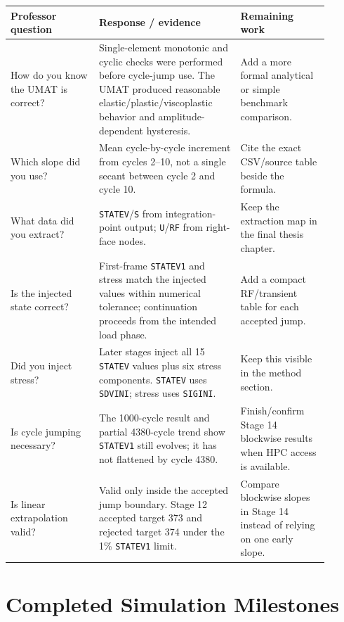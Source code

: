 \documentclass[11pt,a4paper]{article}
\begin{document}
\begin{longtable}{p{0.25\linewidth}p{0.40\linewidth}p{0.25\linewidth}}
\toprule
Professor question & Response / evidence & Remaining work \\
\midrule
\endhead
How do you know the UMAT is correct? & Single-element monotonic and cyclic checks were performed before cycle-jump use. The UMAT produced reasonable elastic/plastic/viscoplastic behavior and amplitude-dependent hysteresis. & Add a more formal analytical or simple benchmark comparison. \\
Which slope did you use? & Mean cycle-by-cycle increment from cycles 2--10, not a single secant between cycle 2 and cycle 10. & Cite the exact CSV/source table beside the formula. \\
What data did you extract? & \texttt{STATEV}/\texttt{S} from integration-point output; \texttt{U}/\texttt{RF} from right-face nodes. & Keep the extraction map in the final thesis chapter. \\
Is the injected state correct? & First-frame \texttt{STATEV1} and stress match the injected values within numerical tolerance; continuation proceeds from the intended load phase. & Add a compact RF/transient table for each accepted jump. \\
Did you inject stress? & Later stages inject all 15 \texttt{STATEV} values plus six stress components. \texttt{STATEV} uses \texttt{SDVINI}; stress uses \texttt{SIGINI}. & Keep this visible in the method section. \\
Is cycle jumping necessary? & The 1000-cycle result and partial 4380-cycle trend show \texttt{STATEV1} still evolves; it has not flattened by cycle 4380. & Finish/confirm Stage 14 blockwise results when HPC access is available. \\
Is linear extrapolation valid? & Valid only inside the accepted jump boundary. Stage 12 accepted target 373 and rejected target 374 under the 1\% \texttt{STATEV1} limit. & Compare blockwise slopes in Stage 14 instead of relying on one early slope. \\
\bottomrule
\end{longtable}

\section{Completed Simulation Milestones}
\end{document}
